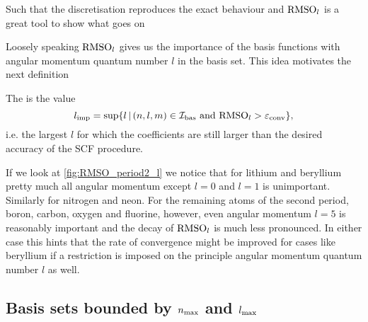 Such that the \CS discretisation reproduces the exact
behaviour and $\text{RMSO}_l$ is a great tool to show what goes on


%





















Loosely speaking $\text{RMSO}_l$ gives us the importance of the basis functions
with angular momentum quantum number $l$ in the \CS basis set.
This idea motivates the next definition

\begin{defn}
	The  is the value
	\[ l_\text{imp} = \sup \{ l \, | \, (n,l,m) \in \mathcal{I}_\text{bas} \ \text{and} \ \text{RMSO}_l > \varepsilon_\text{conv} \}, \]
	i.e. the largest $l$ for which the coefficients are still larger than the
	desired accuracy of the SCF procedure.
\end{defn}

If we look at \vref{fig:RMSO_period2_l} we notice
that for lithium and beryllium pretty much all angular momentum
except $l = 0$ and $l = 1$ is unimportant.
Similarly for nitrogen and neon.
For the remaining atoms of the second period,
boron, carbon, oxygen and fluorine, however,
even angular momentum $l=5$ is reasonably important and the
decay of $\text{RMSO}_l$ is much less pronounced.
In either case this hints that the rate of convergence might
be improved for cases like beryllium
if a restriction is imposed on the principle angular momentum
quantum number $l$ as well.




%
%
\subsection{Basis sets bounded by $n_\text{max}$ and $l_\text{max}$}


